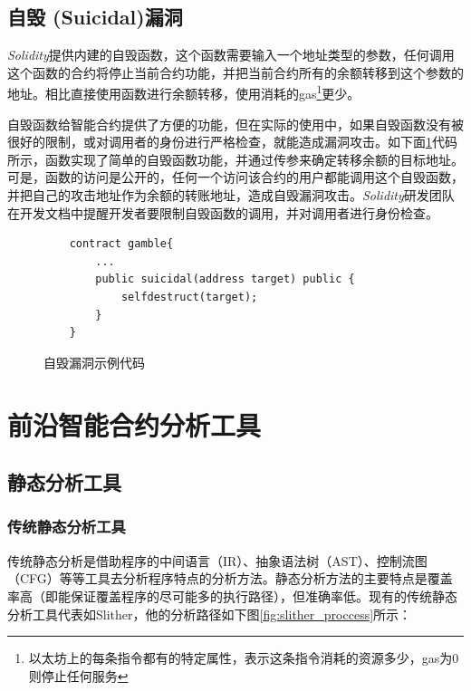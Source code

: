 \subsection{自毁 (Suicidal)漏洞}

\emph{Solidity}提供内建的自毁函数，这个函数需要输入一个地址类型的参数，任何调用这个函数的合约将停止当前合约功能，并把当前合约所有的余额转移到这个参数的地址。相比直接使用函数进行余额转移，使用消耗的gas\footnote{以太坊上的每条指令都有的特定属性，表示这条指令消耗的资源多少，gas为0则停止任何服务}更少。

自毁函数给智能合约提供了方便的功能，但在实际的使用中，如果自毁函数没有被很好的限制，或对调用者的身份进行严格检查，就能造成漏洞攻击。如下面\ref{fig:suicidal_vul}代码所示，函数实现了简单的自毁函数功能，并通过传参来确定转移余额的目标地址。可是，函数的访问是公开的，任何一个访问该合约的用户都能调用这个自毁函数，并把自己的攻击地址作为余额的转账地址，造成自毁漏洞攻击。\emph{Solidity}研发团队在开发文档中提醒开发者要限制自毁函数的调用，并对调用者进行身份检查。

\begin{figure}
\begin{minipage}[htb]{1.0\linewidth}
    \begin{lstlisting}
    contract gamble{
        ...
        public suicidal(address target) public {
            selfdestruct(target);
        }
    }
    \end{lstlisting}
\end{minipage}
\vspace{-5mm}
\caption{自毁漏洞示例代码}
\label{fig:suicidal_vul}
\end{figure}


\section{前沿智能合约分析工具}

\subsection{静态分析工具}

\subsubsection{传统静态分析工具}

传统静态分析是借助程序的中间语言（IR）、抽象语法树（AST）、控制流图（CFG）等等工具去分析程序特点的分析方法。静态分析方法的主要特点是覆盖率高（即能保证覆盖程序的尽可能多的执行路径），但准确率低。现有的传统静态分析工具代表如Slither，他的分析路径如下图\ref{fig:slither_proccess}所示：

